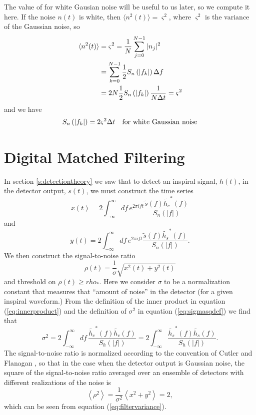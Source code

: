 The value of \ospsd for white Gausian noise will be useful to us later, so we
compute it here. If the noise $n(t)$ is white, then $\langle n^2(t) \rangle =
\varsigma^2$, where $\varsigma^2$ is the variance of the Gaussian noise, so
\begin{equation}
\begin{split}
\langle n^2(t) \rangle &= \varsigma^2 = \frac{1}{N} \sum_{j=0}^{N-1} |n_j|^2 \\
&= \sum_{k=0}^{N-1} \frac{1}{2} S_n\left(\left|f_{k}\right|\right) \Delta f \\
&= 2N \frac{1}{2} S_n\left(\left|f_{k}\right|\right) \frac{1}{N\Delta t} = \varsigma^2
\end{split}
\end{equation}
and we have
\begin{equation}
S_n\left(\left|f_{k}\right|\right) = 2\varsigma^2\Delta t \quad\text{for white Gaussian noise}
\end{equation}

\section{Digital Matched Filtering}
\label{s:matchedfilter}

In section \ref{s:detectiontheory} we saw that to detect an inspiral signal,
$h(t)$, in the detector output, $s(t)$, we must construct the time series
\begin{equation}
\label{eq:xcts}
x(t) = 2 \int_{-\infty}^{\infty}df\,e^{2\pi i f t} 
\frac{\tilde{s}(f) \tilde{h_c}^\ast(f)}{S_n\left(\left|f\right|\right)}
\end{equation}
and
\begin{equation}
\label{eq:ycts}
y(t) = 2 \int_{-\infty}^{\infty}df\,e^{2\pi i f t} 
\frac{\tilde{s}(f) \tilde{h_s}^\ast(f)}{S_n\left(\left|f\right|\right)}.
\end{equation}
We then construct the signal-to-noise ratio
\begin{equation}
\rho(t) = \frac{1}{\sigma}\sqrt{x^2(t) + y^2(t)}
\label{eq:rhosqcts}
\end{equation}
and threshold on $\rho(t) \ge rho_\ast$. Here we consider $\sigma$ to be a
normalization constant that measures that ``amount of noise'' in the detector
(for a given inspiral waveform.) From the definition of the inner product in
equation (\ref{eq:innerproduct}) and the definition of $\sigma^2$ in equation
(\ref{eq:sigmasqdef}) we find that
\begin{equation}
\label{eq:sigmasqcts}
\sigma^2 = 2 \int_{-\infty}^{\infty}df\,
\frac{\tilde{h_c}^\ast(f)\tilde{h_c}(f)}{S_h\left(\left|f\right|\right)} 
= 2 \int_{-\infty}^\infty 
\frac{\tilde{h_s}^\ast(f)\tilde{h_s}(f)}{S_h\left(\left|f\right|\right)}.
\end{equation}
The signal-to-noise ratio is normalized according to the convention
of Cutler and Flanagan \cite{Cutler:1994}, so that in the case when the detector
output is Gaussian noise, the square of the signal-to-noise ratio averaged
over an ensemble of detectors with different realizations of the noise is
\begin{equation}
\left\langle \rho^2 \right\rangle = 
\frac{1}{\sigma^2} \left\langle x^2 + y^2 \right\rangle = 2,
\end{equation}
which can be seen from equation (\ref{eq:filtervariance}).

